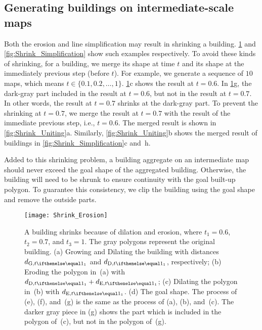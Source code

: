 %
%
%
%


\subsection{Generating buildings on intermediate-scale maps}
\label{sec:Unite}

Both the erosion and line simplification may result in shrinking a 
building.
\fig\ref{fig:Shrink_Erosion} and \fig\ref{fig:Shrink_Simplification} show such 
examples respectively.
To avoid these kinds of shrinking,
for a building, we merge its shape at time $t$ 
and its shape at the immediately previous step (before $t$). 
For example, we generate a sequence of $10$ maps,
which means $t \in \{0.1, 0.2, \dots, 1\}$.
\fig\ref{fig:Shrink_Erosion}c shows the result at $t=0.6$.
In \fig\ref{fig:Shrink_Erosion}g, 
the dark-gray part included in the result at $t=0.6$,
but not in the result at $t=0.7$.
In other words, the result at $t=0.7$ shrinks at the dark-gray part.
To prevent the shrinking at $t=0.7$, we merge the result at $t=0.7$ with the 
result of the immediate previous step, i.e., $t=0.6$.
The merged result is shown in \fig\ref{fig:Shrink_Uniting}a.
Similarly, \fig\ref{fig:Shrink_Uniting}b shows the merged result of buildings 
in \fig\ref{fig:Shrink_Simplification}c and~h.

Added to this shrinking problem, a building aggregate on an intermediate map 
should never exceed
the goal shape of the aggregated building. 
Otherwise, the building will need to be shrunk to ensure continuity with the 
goal built-up polygon.
To guarantee this consistency, 
we clip the building using the goal shape 
and remove the outside parts.

\begin{figure}[tb]
	\centering
	\texttt{[image: Shrink\_Erosion]}
	\caption{A building shrinks because of dilation and erosion, 
		where $t_1=0.6$, $t_2=0.7$, and $t_3=1$.
		The gray polygons represent the original building.
		(a) Growing and Dilating the building with distances $\dtrm[1]{G}$ and 
		$\dtrm[1]{D}$, respectively;
		(b) Eroding the polygon in~(a) with $\dtrm[1]{D} + \dtrm[1]{E}$;
		(c) Dilating the polygon in~(b) with $\dtrm[1]{E}$.
		(d) The goal shape.
		The process of (e), (f), and~(g) is the same as the process of (a), 
		(b), and~(c).
		The darker gray piece in (g) shows 
		the part which is included in the polygon of~(c), 
		but not in the polygon of~(g).
	}
	\label{fig:Shrink_Erosion}
\end{figure}

